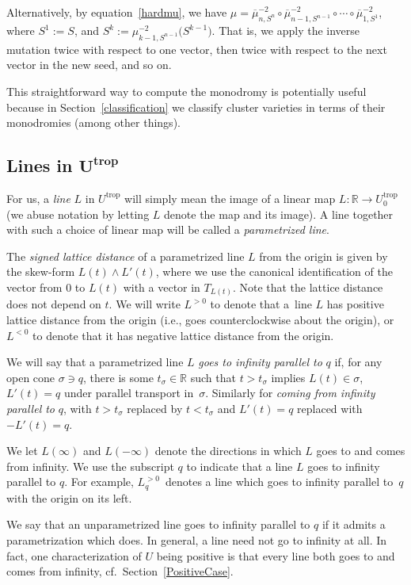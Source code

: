 \documentclass[10pt,a4paper]{amsart}
\numberwithin{equation}{section}
\numberwithin{figure}{section}
\numberwithin{table}{section}
\DeclareMathOperator{\trop}{trop}
\let\?=\overline
\let\bb=\mathbb
\let\rar=\rightarrow
\theoremstyle{definition}
\begin{document}
Alternatively, by equation~\eqref{hardmu}, we have $\mu = \?{\mu}_{n,S^{n}}^{-2} \circ \?{\mu}_{n-1,S^{n-1}}^{-2} \circ \cdots \circ \?{\mu}_{1,S^{1}}^{-2}$, where $S^1:=S$, and $S^{k}:= \mu_{k-1,S^{n-1}}^{-2} \big(S^{k-1}\big)$. That is, we apply the inverse mutation twice with respect to one vector, then twice with respect to the next vector in the new seed, and so on.

This straightforward way to compute the monodromy is potentially useful because in Section~\ref{classification} we classify cluster varieties in terms of their monodromies (among other things).

\subsection[Lines in $U^{\trop}$]{Lines in $\boldsymbol{U^{\trop}}$} \label{lines}

For us, a {\it line} $L$ in $U^{\trop}$ will simply mean the image of a linear map $L\colon \bb{R}\rar U^{\trop}_0$ (we abuse notation by letting $L$ denote the map and its image). A line together with such a choice of linear map will be called a {\it parametrized line}.

The {\it signed lattice distance} of a parametrized line $L$ from the origin is given by the skew-form $L(t)\wedge L'(t)$, where we use the canonical identification of the vector from $0$ to $L(t)$ with a vector in $T_{L(t)}$. Note that the lattice distance does not depend on $t$. We will write $L^{>0}$ to denote that a~line $L$ has positive lattice distance from the origin (i.e., goes counterclockwise about the origin), or~$L^{<0}$ to denote that it has negative lattice distance from the origin.

We will say that a parametrized line $L$ {\it goes to infinity parallel to} $q$ if, for any open cone $\sigma \ni q$, there is some $t_\sigma\in \bb{R}$ such that $t>t_{\sigma}$ implies $L(t) \in \sigma$, $L'(t)=q$ under parallel transport in~$\sigma$. Similarly for {\it coming from infinity parallel to} $q$, with $t>t_{\sigma}$ replaced by $t<t_{\sigma}$ and $L'(t)=q$ replaced with $-L'(t)=q$.

We let $L(\infty)$ and $L(-\infty)$ denote the directions in which $L$ goes to and comes from infinity. We use the subscript $q$ to indicate that a line $L$ goes to infinity parallel to $q$. For example, $L_q^{>0}$~denotes a line which goes to infinity parallel to~$q$ with the origin on its left.

We say that an unparametrized line goes to infinity parallel to $q$ if it admits a parametrization which does. In general, a line need not go to infinity at all. In fact, one characterization of $U$ being positive is that every line both goes to and comes from infinity, cf.\ Section~\ref{PositiveCase}.
\end{document}
